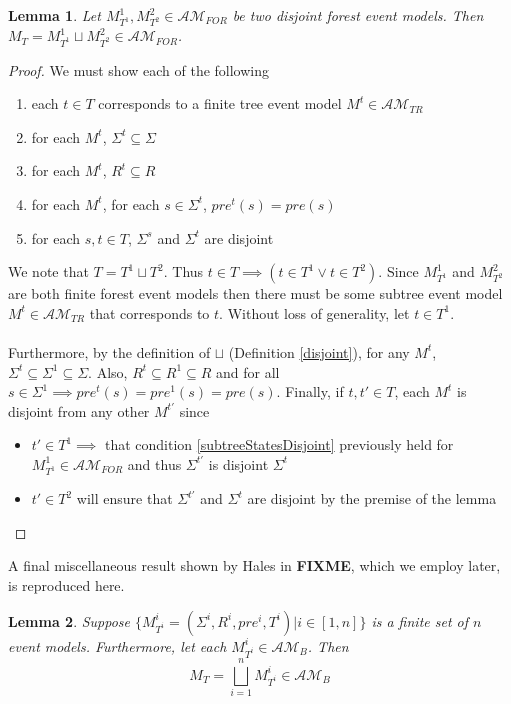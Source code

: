 \documentclass[12pt, a4paper, titlepage]{scrartcl}
\newtheorem{lemma}{Lemma}[subsection]
\numberwithin{equation}{section}
\newcommand{\eventClass}{\mathcal{AM}}
\newcommand{\treeClass}{\eventClass_{TR}}
\newcommand{\forestClass}{\eventClass_{FOR}}
\newcommand{\FIXME}{{\bf FIXME}}
\begin{document}
\begin{lemma} \label{disjForestIsForest}
Let $M^1_{T^1}, M^2_{T^2} \in \forestClass$ be two disjoint forest event models.
Then $M_T = M^1_{T^1} \sqcup M^2_{T^2} \in \forestClass$.
\end{lemma}

\begin{proof}
We must show each of the following
\begin{enumerate}
	\item each $t \in T$ corresponds to a finite tree event model $M^t \in \treeClass$ \label{treeCorrespondence}
	\item for each $M^t$, $\Sigma^t \subseteq \Sigma$ \label{forestStateSubsets}
	\item for each $M^t$, $R^t \subseteq R$ \label{forestEdgeSubsets}
	\item for each $M^t$, for each $s \in \Sigma^t$, $pre^t(s) = pre(s)$ \label{preconMatch}
	\item for each $s, t \in T$, $\Sigma^s$ and $\Sigma^t$ are disjoint \label{subtreeStatesDisjoint}
\end{enumerate}

We note that $T = T^1 \sqcup T^2$.
Thus $t \in T \implies (t \in T^1 \lor t \in T^2)$.
Since $M^1_{T^1}$ and $M^2_{T^2}$ are both finite forest event models then there must be some
subtree event model $M^t \in \treeClass$ that corresponds to $t$.
Without loss of generality, let $t \in T^1$.\\
\\
Furthermore, by the definition of $\sqcup$ (Definition \ref{disjoint}), for any $M^t$, $\Sigma^t \subseteq \Sigma^1 \subseteq \Sigma$.
Also, $R^t \subseteq R^1 \subseteq R$ and for all $s \in \Sigma^1 \implies pre^t(s) = pre^1(s) =
pre(s)$.
Finally, if $t, t' \in T$, each $M^t$ is disjoint from any other $M^{t'}$ since
\begin{itemize}
	\item $t' \in T^1 \implies$ that condition \ref{subtreeStatesDisjoint} previously held for
	$M^1_{T^1} \in \forestClass$ and thus $\Sigma^{t'}$ is disjoint $\Sigma^t$
	\item $t' \in T^2$ will ensure that $\Sigma^{t'}$ and $\Sigma^t$ are disjoint by the premise of
	the lemma
\end{itemize}
\end{proof}

A final miscellaneous result shown by Hales in \FIXME, which we employ later, is reproduced here.

\begin{lemma} \label{brestrictDisjoint}
Suppose $\{ M^i_{T^i} = (\Sigma^i, R^i, pre^i, T^i) | i \in [1, n] \}$ is a finite set of $n$ event
models.
Furthermore, let each $M^i_{T^i} \in \eventClass_B$.
Then
\[
	M_T = \bigsqcup_{i = 1}^{n} M^i_{T^i} \in \eventClass_B
\]
\end{lemma}
\end{document}
